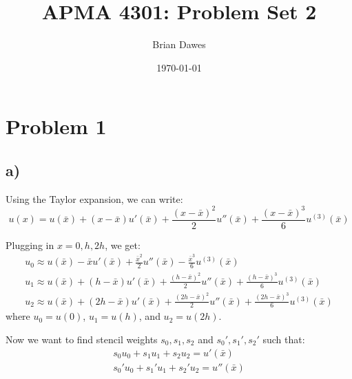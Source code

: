 \documentclass{article}
\begin{document}
\title{APMA 4301: Problem Set 2}
\author{Brian Dawes}
\date{\today}
\maketitle
\section*{Problem 1}
\subsection*{a)}
Using the Taylor expansion, we can write:
\begin{equation}
u(x) = u(\bar x)+(x-\bar x)u'(\bar x)+\frac{(x-\bar x)^2}{2}u''(\bar x)+\frac{(x-\bar x)^3}{6}u^{(3)}(\bar x)
\end{equation}

Plugging in $x=0,h,2h$, we get:
\begin{eqnarray}
u_0 \approx u(\bar x)-\bar xu'(\bar x)+\frac{\bar x^2}{2}u''(\bar x)-\frac{\bar x^3}{6}u^{(3)}(\bar x) \\
u_1 \approx u(\bar x)+(h-\bar x)u'(\bar x)+\frac{(h-\bar x)^2}{2}u''(\bar x)+\frac{(h-\bar x)^3}{6}u^{(3)}(\bar x) \\
u_2 \approx u(\bar x)+(2h-\bar x)u'(\bar x)+\frac{(2h-\bar x)^2}{2}u''(\bar x)+\frac{(2h-\bar x)^3}{6}u^{(3)}(\bar x)
\end{eqnarray}
where $u_0=u(0)$, $u_1=u(h)$, and $u_2=u(2h)$.

Now we want to find stencil weights $s_0,s_1,s_2$ and $s_0',s_1',s_2'$ such that:
\begin{gather}
s_0u_0+s_1u_1+s_2u_2=u'(\bar x) \\
s_0'u_0+s_1'u_1+s_2'u_2=u''(\bar x)
\end{gather}
\end{document}
